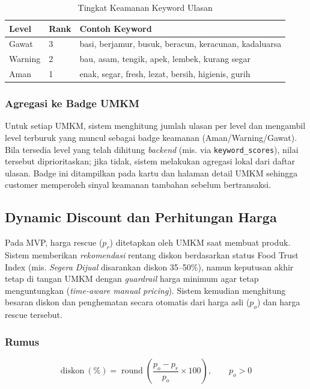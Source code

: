 \begin{table}[htbp]
\centering
\caption{Tingkat Keamanan Keyword Ulasan}
\label{tab:keyword}
\small
\begin{tabularx}{\textwidth}{|l|l|X|}
\hline
\textbf{Level} & \textbf{Rank} & \textbf{Contoh Keyword} \\
\hline
Gawat & 3 & basi, berjamur, busuk, beracun, keracunan, kadaluarsa \\
\hline
Warning & 2 & bau, asam, tengik, apek, lembek, kurang segar \\
\hline
Aman & 1 & enak, segar, fresh, lezat, bersih, higienis, gurih \\
\hline
\end{tabularx}
\end{table}

\subsubsection{Agregasi ke Badge UMKM}

Untuk setiap UMKM, sistem menghitung jumlah ulasan per level dan mengambil level terburuk yang
muncul sebagai badge keamanan (Aman/Warning/Gawat). Bila tersedia level yang telah dihitung
\textit{backend} (mis. via \texttt{keyword\_scores}), nilai tersebut diprioritaskan; jika tidak,
sistem melakukan agregasi lokal dari daftar ulasan. Badge ini ditampilkan pada kartu dan halaman
detail UMKM sehingga customer memperoleh sinyal keamanan tambahan sebelum bertransaksi.

\subsection{Dynamic Discount dan Perhitungan Harga}

Pada MVP, harga rescue ($p_{r}$) ditetapkan oleh UMKM saat membuat produk. Sistem memberikan
\emph{rekomendasi} rentang diskon berdasarkan status Food Trust Index (mis. \emph{Segera Dijual}
disarankan diskon 35--50\%), namun keputusan akhir tetap di tangan UMKM dengan \textit{guardrail}
harga minimum agar tetap menguntungkan (\textit{time-aware manual pricing}). Sistem kemudian
menghitung besaran diskon dan penghematan secara otomatis dari harga asli ($p_{o}$) dan harga
rescue tersebut.

\subsubsection{Rumus}

\begin{equation}
\mathrm{diskon}\ (\%) = \operatorname{round}\!\left( \frac{p_{o} - p_{r}}{p_{o}} \times 100 \right), \qquad p_o > 0
\end{equation}

